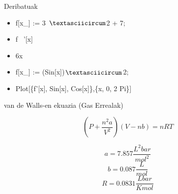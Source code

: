 \documentclass[xcolor=x11names,table]{beamer}
\begin{document}
\begin{frame}{Deribatuak}
\begin{itemize}
	\item <1-> f[x\_] := 3 $\textasciicircum$2 + 7;
	\item <1-> f \ '[x]
	\item <2-> 6x
		\item <3-> f[x\_] := (Sin[x])$\textasciicircum$2; 
		\item <3-> Plot[\{f'[x], Sin[x], Cos[x]\},\{x, 0, 2 Pi\}]
\end{itemize}
\begin{center}
\end{center}
\end{frame}

\begin{frame}{van de Walls-en ekuazia (Gas Errealak)}

	\[ (P+\frac{n^2 a }{V^2})(V-nb)=nRT \]



	\[ a=7.857 \frac{L^2bar}{mol^{2}} \]
	\[ b=0.087 \frac{L}{mol} \]
	\[ R=0.0831 \frac{Lbar}{Kmol}\]

\end{frame}
\end{document}
